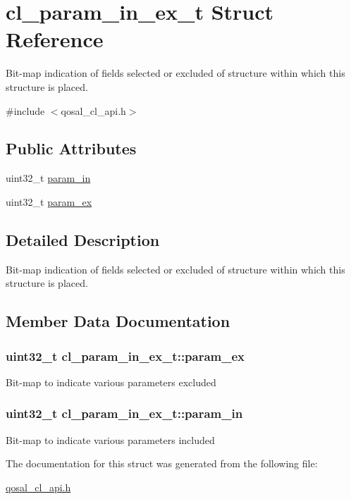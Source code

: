 \hypertarget{structcl__param__in__ex__t}{\section{cl\-\_\-param\-\_\-in\-\_\-ex\-\_\-t Struct Reference}
\label{structcl__param__in__ex__t}
}


Bit-\/map indication of fields selected or excluded of structure within which this structure is placed.  




{\ttfamily \#include $<$qosal\-\_\-cl\-\_\-api.\-h$>$}

\subsection*{Public Attributes}
\begin{DoxyCompactItemize}
\item 
uint32\-\_\-t \hyperlink{structcl__param__in__ex__t_a005f264d861b00654d8ca07650fbeb85}{param\-\_\-in}
\item 
uint32\-\_\-t \hyperlink{structcl__param__in__ex__t_ad7b4d1bf551cffd1bfb75cf63757d2de}{param\-\_\-ex}
\end{DoxyCompactItemize}


\subsection{Detailed Description}
Bit-\/map indication of fields selected or excluded of structure within which this structure is placed. 

\subsection{Member Data Documentation}
\hypertarget{structcl__param__in__ex__t_ad7b4d1bf551cffd1bfb75cf63757d2de}{
\subsubsection[{param\-\_\-ex}]{\setlength{\rightskip}{0pt plus 5cm}uint32\-\_\-t cl\-\_\-param\-\_\-in\-\_\-ex\-\_\-t\-::param\-\_\-ex}}\label{structcl__param__in__ex__t_ad7b4d1bf551cffd1bfb75cf63757d2de}
Bit-\/map to indicate various parameters excluded \hypertarget{structcl__param__in__ex__t_a005f264d861b00654d8ca07650fbeb85}{
\subsubsection[{param\-\_\-in}]{\setlength{\rightskip}{0pt plus 5cm}uint32\-\_\-t cl\-\_\-param\-\_\-in\-\_\-ex\-\_\-t\-::param\-\_\-in}}\label{structcl__param__in__ex__t_a005f264d861b00654d8ca07650fbeb85}
Bit-\/map to indicate various parameters included 

The documentation for this struct was generated from the following file\-:\begin{DoxyCompactItemize}
\item 
\hyperlink{qosal__cl__api_8h}{qosal\-\_\-cl\-\_\-api.\-h}\end{DoxyCompactItemize}
